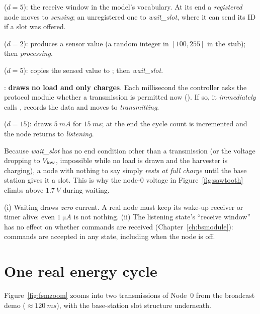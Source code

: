 \begin{description}[leftmargin=0.4cm,font=\sffamily\bfseries]
 \item[listening] ($d=5$): the receive window in the model's vocabulary. At its end a \emph{registered} node moves to \emph{sensing}; an unregistered one to \emph{wait\_slot}, where it can send its ID if a slot was offered.
 \item[sensing] ($d=2$): produces a sensor value (a random integer in $[100,255]$ in the stub); then \emph{processing}.
 \item[processing] ($d=5$): copies the sensed value to ; then \emph{wait\_slot}.
 \item[wait\_slot]: \textbf{draws no load and only charges}. Each millisecond the controller asks the protocol module whether a transmission is permitted now (). If so, it \emph{immediately} calls , records the data and moves to \emph{transmitting}.
 \item[transmitting] ($d=15$): draws $\SI{5}{mA}$ for $\SI{15}{ms}$; at the end the cycle count is incremented and the node returns to \emph{listening}.
\end{description}
Because \emph{wait\_slot} has no end condition other than a transmission (or the voltage dropping to $V_{\mathrm{low}}$, impossible while no load is drawn and the harvester is charging), a node with nothing to say simply \emph{rests at full charge} until the base station gives it a slot. This is why the node-0 voltage in Figure~\ref{fig:sawtooth} climbs above $\SI{1.7}{V}$ during waiting.

\begin{reality}
(i) Waiting draws \emph{zero} current. A real node must keep its wake-up receiver or timer alive: even $\SI{1}{\micro A}$ is not nothing. (ii) The listening state's ``receive window'' has no effect on whether commands are received (Chapter~\ref{ch:bsmodule}): commands are accepted in any state, including when the node is off.
\end{reality}

\section{One real energy cycle}
\label{sec:realcycle}

Figure~\ref{fig:fsmzoom} zooms into two transmissions of Node~0 from the broadcast demo ($\approx\SI{120}{ms}$), with the base-station slot structure underneath.

